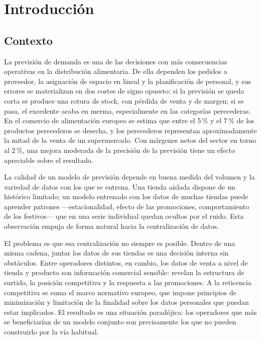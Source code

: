 \chapter{Introducción}
\label{cap:introduccion}

\section{Contexto}

La previsión de demanda es una de las decisiones con más consecuencias operativas en la
distribución alimentaria. De ella dependen los pedidos a proveedor, la asignación de espacio en
lineal y la planificación de personal, y sus errores se materializan en dos costes de signo
opuesto: si la previsión se queda corta se produce una rotura de stock, con pérdida de venta y de
margen; si se pasa, el excedente acaba en merma, especialmente en las categorías perecederas. En
el comercio de alimentación europeo se estima que entre el 5\,\% y el 7\,\% de los productos
perecederos se desecha, y los perecederos representan aproximadamente la mitad de la venta de un
supermercado. Con márgenes netos del sector en torno al 2\,\%, una mejora moderada de la precisión
de la previsión tiene un efecto apreciable sobre el resultado.

La calidad de un modelo de previsión depende en buena medida del volumen y la variedad de datos
con los que se entrena. Una tienda aislada dispone de un histórico limitado; un modelo entrenado
con los datos de muchas tiendas puede aprender patrones —estacionalidad, efecto de las
promociones, comportamiento de los festivos— que en una serie individual quedan ocultos por el
ruido. Esta observación empuja de forma natural hacia la centralización de datos.

El problema es que esa centralización no siempre es posible. Dentro de una misma cadena, juntar
los datos de sus tiendas es una decisión interna sin obstáculos. Entre operadores distintos, en
cambio, los datos de venta a nivel de tienda y producto son información comercial sensible:
revelan la estructura de surtido, la posición competitiva y la respuesta a las promociones. A la
reticencia competitiva se suma el marco normativo europeo, que impone principios de minimización y
limitación de la finalidad sobre los datos personales que puedan estar implicados. El resultado es
una situación paradójica: los operadores que más se beneficiarían de un modelo conjunto son
precisamente los que no pueden construirlo por la vía habitual.

